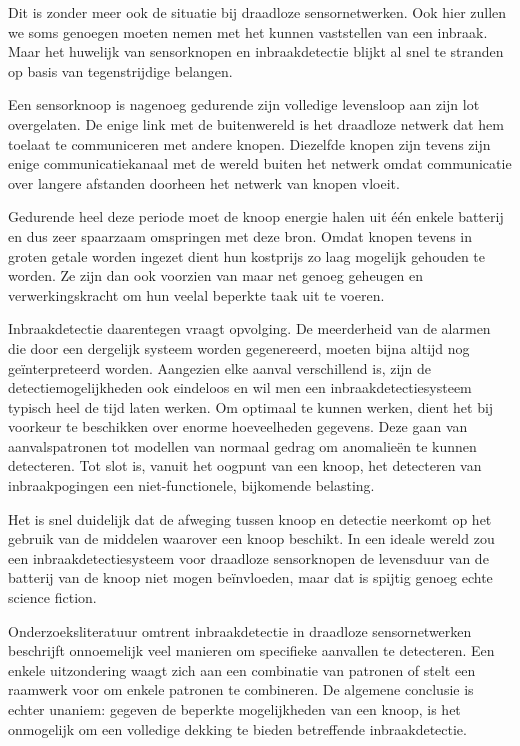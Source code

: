 \documentclass[DIV=calc,paper=a4,fontsize=11pt,twocolumn]{scrartcl}
\begin{document}
Dit is zonder meer ook de situatie bij draadloze sensornetwerken. Ook hier
zullen we soms genoegen moeten nemen met het kunnen vaststellen van een
inbraak. Maar het huwelijk van sensorknopen en inbraakdetectie blijkt al snel
te stranden op basis van tegenstrijdige belangen.

Een sensorknoop is nagenoeg gedurende zijn volledige levensloop aan zijn lot
overgelaten. De enige link met de buitenwereld is het draadloze netwerk dat hem
toelaat te communiceren met andere knopen. Diezelfde knopen zijn tevens zijn
enige communicatiekanaal met de wereld buiten het netwerk omdat communicatie
over langere afstanden doorheen het netwerk van knopen vloeit.

Gedurende heel deze periode moet de knoop energie halen uit \'e\'en enkele
batterij en dus zeer spaarzaam omspringen met deze bron. Omdat knopen tevens in
groten getale worden ingezet dient hun kostprijs zo laag mogelijk gehouden te
worden. Ze zijn dan ook voorzien van maar net genoeg geheugen en
verwerkingskracht om hun veelal beperkte taak uit te voeren.

Inbraakdetectie daarentegen vraagt opvolging. De meerderheid van de alarmen die
door een dergelijk systeem worden gegenereerd, moeten bijna altijd nog
ge\"interpreteerd worden. Aangezien elke aanval verschillend is, zijn de
detectiemogelijkheden ook eindeloos en wil men een inbraakdetectiesysteem
typisch heel de tijd laten werken. Om optimaal te kunnen werken, dient het bij
voorkeur te beschikken over enorme hoeveelheden gegevens. Deze gaan van
aanvalspatronen tot modellen van normaal gedrag om anomalie\"en te kunnen
detecteren. Tot slot is, vanuit het oogpunt van een knoop, het detecteren van
inbraakpogingen een niet-functionele, bijkomende belasting.

Het is snel duidelijk dat de afweging tussen knoop en detectie neerkomt op het
gebruik van de middelen waarover een knoop beschikt. In een ideale wereld zou
een inbraakdetectiesysteem voor draadloze sensorknopen de levensduur van de
batterij van de knoop niet mogen be\"invloeden, maar dat is spijtig genoeg
echte science fiction.

Onderzoeksliteratuur omtrent inbraakdetectie in draadloze sensornetwerken
beschrijft onnoemelijk veel manieren om specifieke aanvallen te detecteren. Een
enkele uitzondering waagt zich aan een combinatie van patronen of stelt een
raamwerk voor om enkele patronen te combineren. De algemene conclusie is echter
unaniem: gegeven de beperkte mogelijkheden van een knoop, is het onmogelijk om
een volledige dekking te bieden betreffende inbraakdetectie.
\end{document}
